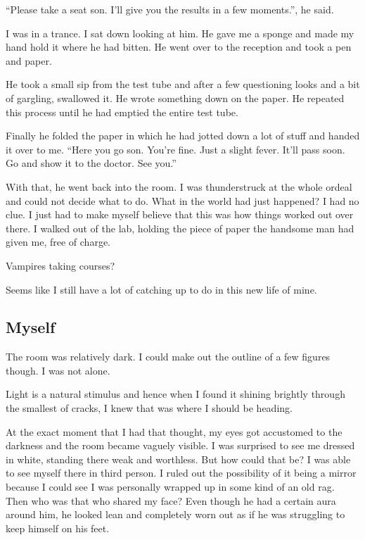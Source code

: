 \documentclass[twoside,11pt]{article}
\begin{document}
``Please take a seat son. I'll give you the results in a few moments.'', he said.

I was in a trance. I sat down looking at him. He gave me a sponge and made my hand hold it where he had bitten. He went over to the reception and took a pen and paper.

He took a small sip from the test tube and after a few questioning looks and a bit of gargling, swallowed it. He wrote something down on the paper. He repeated this process until he had emptied the entire test tube.

Finally he folded the paper in which he had jotted down a lot of stuff and handed it over to me. ``Here you go son. You're fine. Just a slight fever. It'll pass soon. Go and show it to the doctor. See you.''

With that, he went back into the room. I was thunderstruck at the whole ordeal and could not decide what to do. What in the world had just happened? I had no clue. I just had to make myself believe that this was how things worked out over there. I walked out of the lab, holding the piece of paper the handsome man had given me, free of charge.

Vampires taking courses?

Seems like I still have a lot of catching up to do in this new life of mine.

\newpage
\begin{center}
  \section{Myself}
\end{center}
\bigskip
\bigskip
\bigskip

The room was relatively dark. I could make out the outline of a few figures though. I was not alone.

Light is a natural stimulus and hence when I found it shining brightly through the smallest of cracks, I knew that was where I should be heading.

At the exact moment that I had that thought, my eyes got accustomed to the darkness and the room became vaguely visible. I was surprised to see me dressed in white, standing there weak and worthless. But how could that be? I was able to see myself there in third person. I ruled out the possibility of it being a mirror because I could see I was personally wrapped up in some kind of an old rag. Then who was that who shared my face? Even though he had a certain aura around him, he looked lean and completely worn out as if he was struggling to keep himself on his feet.
\end{document}

